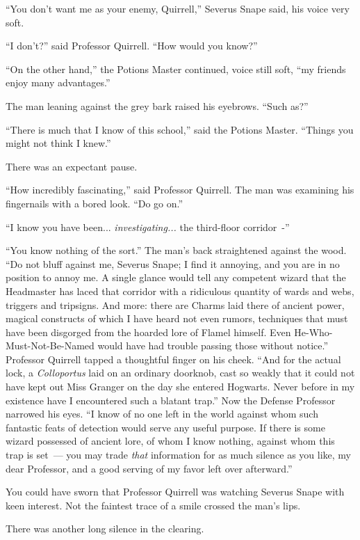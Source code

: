 ``You don't want me as your enemy, Quirrell,'' Severus Snape said, his voice very soft.

``I don't?'' said Professor Quirrell. ``How would you know?''

``On the other hand,'' the Potions Master continued, voice still soft, ``my friends enjoy many advantages.''

The man leaning against the grey bark raised his eyebrows. ``Such as?''

``There is much that I know of this school,'' said the Potions Master. ``Things you might not think I knew.''

There was an expectant pause.

``How incredibly fascinating,'' said Professor Quirrell. The man was examining his fingernails with a bored look. ``Do go on.''

``I know you have been... \emph{investigating...} the third-floor corridor~-''

``You know nothing of the sort.'' The man's back straightened against the wood. ``Do not bluff against me, Severus Snape; I find it annoying, and you are in no position to annoy me. A single glance would tell any competent wizard that the Headmaster has laced that corridor with a ridiculous quantity of wards and webs, triggers and tripsigns. And more: there are Charms laid there of ancient power, magical constructs of which I have heard not even rumors, techniques that must have been disgorged from the hoarded lore of Flamel himself. Even He-Who-Must-Not-Be-Named would have had trouble passing those without notice.'' Professor Quirrell tapped a thoughtful finger on his cheek. ``And for the actual lock, a \emph{Colloportus} laid on an ordinary doorknob, cast so weakly that it could not have kept out Miss Granger on the day she entered Hogwarts. Never before in my existence have I encountered such a blatant trap.'' Now the Defense Professor narrowed his eyes. ``I know of no one left in the world against whom such fantastic feats of detection would serve any useful purpose. If there is some wizard possessed of ancient lore, of whom I know nothing, against whom this trap is set~--- you may trade \emph{that} information for as much silence as you like, my dear Professor, and a good serving of my favor left over afterward.''

You could have sworn that Professor Quirrell was watching Severus Snape with keen interest. Not the faintest trace of a smile crossed the man's lips.

There was another long silence in the clearing.

